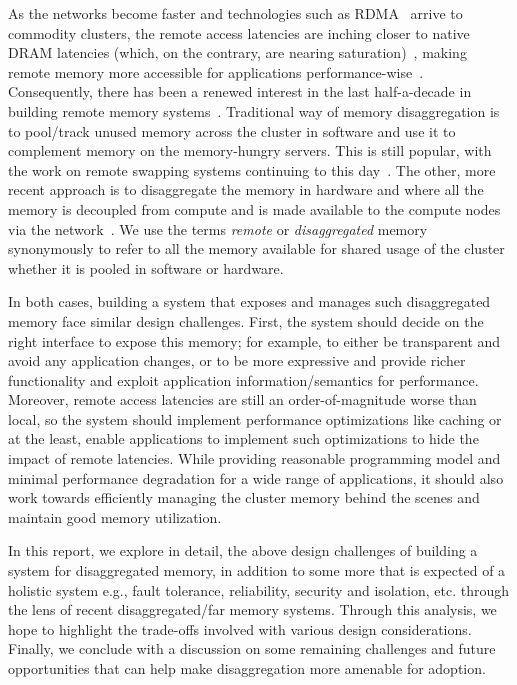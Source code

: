 As the networks become faster and technologies such as 
RDMA~\cite{farm,rocev2} arrive to commodity clusters, 
the remote access latencies are inching closer to native 
DRAM latencies (which, on the contrary, are nearing 
saturation)~\cite{Aguilera2017}, making remote memory more 
accessible for applications performance-wise~\cite{netdisagg}.
Consequently, there has been a renewed interest in 
the last half-a-decade in building remote memory 
systems~\cite{infiniswap,zswap,leap,fastswap,
legoos,kona,aifm,semeru,remregions,literdma}.
Traditional way of memory disaggregation is to pool/track  
unused memory across the cluster in software 
and use it to complement memory on the memory-hungry servers.
This is still popular, with the work on remote swapping systems 
continuing to this day~\cite{infiniswap,fastswap,zswap,leap}.
The other, more recent approach is to disaggregate the memory 
in hardware and where all the memory is decoupled from 
compute and is made available to the compute nodes via 
the network~\cite{legoos,bladedisagg1,sonuma}. 
We use the terms \textit{remote} or \textit{disaggregated} 
memory synonymously to refer to all the memory available for 
shared usage of the cluster 
whether it is pooled in software or hardware. 

In both cases, building a system 
that exposes and manages such disaggregated memory face  
similar design challenges. First, the system should decide on
the right interface to expose this memory; for example,
to either be transparent and avoid any application changes, 
or to be more expressive and provide richer functionality and 
exploit application information/semantics for performance. 
Moreover, remote access 
latencies are still an order-of-magnitude worse than local, 
so the system should implement performance optimizations 
like caching or at the least, enable applications to 
implement such optimizations to hide the impact of remote 
latencies. While providing reasonable programming model and 
minimal performance degradation for a wide range of 
applications, it should also work towards efficiently 
managing the cluster memory behind the scenes and 
maintain good memory utilization. 

In this report, we explore in 
detail, the above design 
challenges of building a system for disaggregated memory, 
in addition to some more that is expected of a holistic 
system e.g., fault tolerance, reliability, security and 
isolation, etc. through the lens of recent disaggregated/far 
memory systems. Through this analysis, we hope to 
highlight the trade-offs involved with various design 
considerations. Finally, we conclude with a discussion on 
some remaining challenges and future opportunities that 
can help make disaggregation more amenable for adoption. 